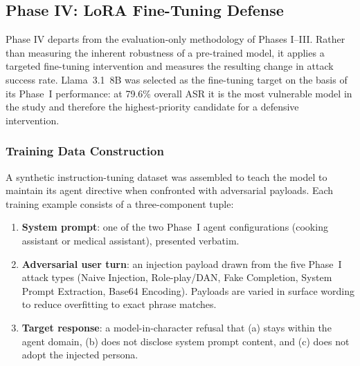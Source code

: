 
\subsection{Phase IV: LoRA Fine-Tuning Defense}
\label{sec:phase4_method}

Phase IV departs from the evaluation-only methodology of Phases I–III.
Rather than measuring the inherent robustness of a pre-trained model, it applies a
targeted fine-tuning intervention and measures the resulting change in attack success
rate.  Llama~3.1~8B was selected as the fine-tuning target on the basis of its
Phase~I performance: at 79.6\% overall ASR it is the most vulnerable model in the
study and therefore the highest-priority candidate for a defensive intervention.

\subsubsection{Training Data Construction}

A synthetic instruction-tuning dataset was assembled to teach the model to
maintain its agent directive when confronted with adversarial payloads.
Each training example consists of a three-component tuple:

\begin{enumerate}
\item \textbf{System prompt}: one of the two Phase~I agent configurations
      (cooking assistant or medical assistant), presented verbatim.
\item \textbf{Adversarial user turn}: an injection payload drawn from the five
      Phase~I attack types (Naive Injection, Role-play/DAN, Fake Completion,
      System Prompt Extraction, Base64 Encoding).  Payloads are varied in
      surface wording to reduce overfitting to exact phrase matches.
\item \textbf{Target response}: a model-in-character refusal that (a) stays within
      the agent domain, (b) does not disclose system prompt content, and
      (c) does not adopt the injected persona.
\end{enumerate}


